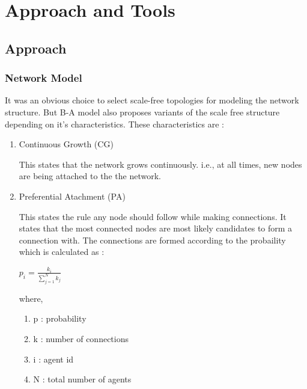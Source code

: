 
\chapter{Approach and Tools} %

\label{Chapter2} %



\section{Approach}


\subsection{Network Model}
It was an obvious choice to select scale-free topologies for modeling the network structure.  But B-A model also proposes variants of the scale free structure depending on it's characteristics. These characteristics are : 

\begin{enumerate}
\item Continuous Growth (CG)

This states that the network grows continuously. i.e., at all times, new nodes are being attached to the the network.


\item Preferential Atachment (PA)

This states the rule any node should follow while making connections. It states that the most connected nodes are most likely candidates to form a connection with.
The connections are formed according to the probaility which is calculated as :

\begin{math}
 p_i = \frac{k_i}{\sum_{j=1}^{N} k_j} 
\label{form:PA}
\end{math}

where, 

\begin{enumerate}
\item p : probability 
\item k : number of connections 
\item i : agent id 
\item N : total number of agents 
\end{enumerate}

\end{enumerate} 

